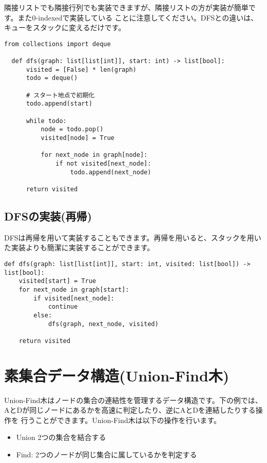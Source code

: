 隣接リストでも隣接行列でも実装できますが、隣接リストの方が実装が簡単です。また0-indexedで実装している
ことに注意してください。DFSとの違いは、キューをスタックに変えるだけです。

\begin{lstlisting}[caption=深さ優先探索ヒープの実装, label=dfs, frame=TRBL, label={dfs}]
  from collections import deque

  def dfs(graph: list[list[int]], start: int) -> list[bool]:
      visited = [False] * len(graph)
      todo = deque()
      
      # スタート地点で初期化
      todo.append(start)
      
      while todo:
          node = todo.pop()
          visited[node] = True
          
          for next_node in graph[node]:
              if not visited[next_node]:
                  todo.append(next_node)
                  
      return visited
\end{lstlisting}
\subsection{DFSの実装(再帰)}
DFSは再帰を用いて実装することもできます。再帰を用いると、スタックを用いた実装よりも簡潔に実装することができます。

\begin{lstlisting}[caption=深さ優先探索再帰の実装, label=dfs_recursive, frame=TRBL, label={dfs_recursive}]
def dfs(graph: list[list[int]], start: int, visited: list[bool]) -> list[bool]:   
    visited[start] = True
    for next_node in graph[start]:
        if visited[next_node]:
            continue
        else:
            dfs(graph, next_node, visited)
    
    return visited
\end{lstlisting}

\newpage

\section{素集合データ構造(Union-Find木)}
Union-Find木はノードの集合の連結性を管理するデータ構造です。下の例では、AとDが同じノードにあるかを高速に判定したり、逆にAとDを連結したりする操作を
行うことができます。Union-Find木は以下の操作を行います。

\vspace{0.5cm}

\begin{itemize}
  \item Union 2つの集合を結合する
  \item Find: 2つのノードが同じ集合に属しているかを判定する
\end{itemize}

